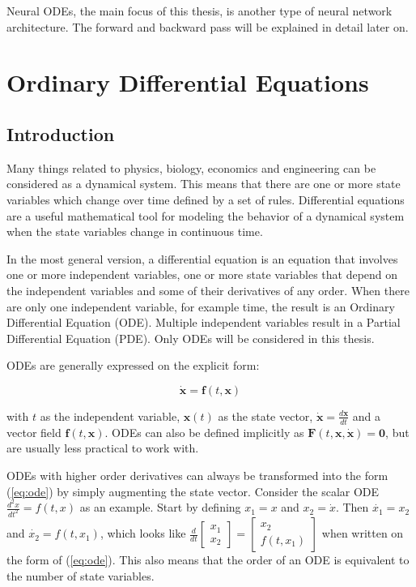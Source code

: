 \documentclass[12pt,a4paper]{book}
\begin{document}

Neural ODEs, the main focus of this thesis, is another type of neural network architecture. The forward and backward pass will be explained in detail later on.

\section{Ordinary Differential Equations}

\subsection{Introduction}

Many things related to physics, biology, economics and engineering can be considered as a dynamical system. This means that there are one or more state variables which change over time defined by a set of rules. Differential equations are a useful mathematical tool for modeling the behavior of a dynamical system when the state variables change in continuous time.

In the most general version, a differential equation is an equation that involves one or more independent variables, one or more state variables that depend on the independent variables and some of their derivatives of any order. When there are only one independent variable, for example time, the result is an Ordinary Differential Equation (ODE). Multiple independent variables result in a Partial Differential Equation (PDE). Only ODEs will be considered in this thesis.

ODEs are generally expressed on the explicit form:

\begin{equation}
    \dot{\bm{x}} = \bm{f}(t, \bm{x})
    \label{eq:ode}
\end{equation}

\noindent with $t$ as the independent variable, $\bm{x}(t)$ as the state vector, $\dot{\bm{x}} = \frac{d \bm{x}}{d t}$ and a vector field $\bm{f}(t, \bm{x})$. ODEs can also be defined implicitly as $\bm{F}(t, \bm{x}, \dot{\bm{x}}) = \bm{0}$, but are usually less practical to work with.

ODEs with higher order derivatives can always be transformed into the form (\ref{eq:ode}) by simply augmenting the state vector. Consider the scalar ODE $\frac{d^2 x}{d t^2} = f(t, x)$ as an example. Start by defining $x_1 = x$ and $x_2 = \dot{x}$. Then $\dot{x_1} = x_2$ and $\dot{x_2} = f(t, x_1)$, which looks like $\frac{d}{d t} \begin{bmatrix} x_1 \\ x_2 \end{bmatrix} = \begin{bmatrix} x_2 \\ f(t, x_1) \end{bmatrix}$ when written on the form of (\ref{eq:ode}). This also means that the order of an ODE is equivalent to the number of state variables.
\end{document}
